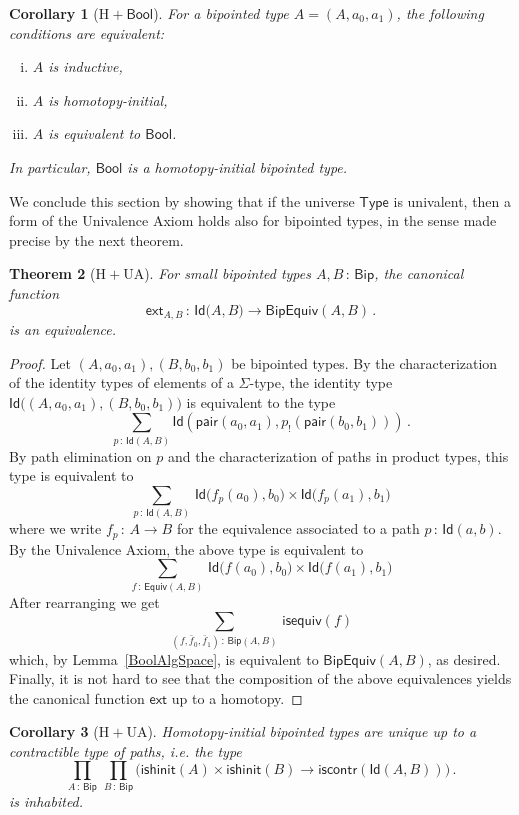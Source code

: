 \documentclass[10pt,a4paper,oneside,reqno]{amsart}
\theoremstyle{mythm}
\newtheorem{theorem}{Theorem}[section]
\newtheorem{corollary}[theorem]{Corollary}
\theoremstyle{mydef}
\theoremstyle{myrmk}
\newcommand{\co}{\,{:}\,}
\newcommand{\Hint}{\mathrm{H}}
\newcommand{\iscontr}{\mathsf{iscontr}}
\newcommand{\isequiv}{\mathsf{isequiv}}
\newcommand{\isbiphinit}{\mathsf{ishinit}}
\newcommand{\ext}{\mathsf{ext}}
\newcommand{\Bool}{\mathsf{Bool}}
\newcommand{\Id}{\mathsf{Id}}
\newcommand{\pair}{\mathsf{pair}}
\newcommand{\U}{\mathsf{Type}}
\newcommand{\Bip}{\mathsf{Bip}}
\newcommand{\BipHom}{\mathsf{Bip}}
\newcommand{\BipEquiv}{\mathsf{BipEquiv}}
\begin{document}
\begin{corollary}[$\Hint + \Bool$]  For a bipointed type $A = (A, a_0, a_1)$, the following 
conditions are equivalent:
\begin{enumerate}[(i)]
\item $A$ is inductive,
\item $A$ is homotopy-initial,
\item $A$ is equivalent to $\Bool$. 
\end{enumerate}
In particular, $\Bool$ is a homotopy-initial bipointed type.
\end{corollary}

We conclude this section by showing that if the universe $\U$ is univalent, then a form of the Univalence Axiom holds also for bipointed types, in the sense made precise by the next theorem.


\begin{theorem}[$\Hint + \mathrm{UA}$] \label{thm:bipunivalence}
For small bipointed types $A, B \co \Bip$, the canonical function
\[ 
\ext_{A,B} \co \Id \big(A,B\big) \to  \BipEquiv(A,B) \, .
\] 
is an equivalence.
\end{theorem} 

\begin{proof} 
Let $ (A,a_0,a_1), (B,b_0,b_1)$ be bipointed types. By the characterization of the identity types
of  elements of a $\Sigma$-type, the 
identity type $\Id\big( (A,a_0,a_1),  (B,b_0,b_1)\big)$ is equivalent to  the type
\[
\sum_{p \co \Id(A,B)} \Id(\pair(a_0,a_1),  p_{!}(\pair(b_0,b_1))) \, .
\]
By path elimination on $p$ and the characterization of paths in product types, this type is equivalent to
\[ 
\sum_{p \co \Id(A,B)} \, \Id \big( f_p(a_0),  b_0\big) \times \Id \big( f_p(a_1) , b_1)
 \]
where we write $f_p \co A \to B$ for the equivalence associated to a path $p \co \Id(a,b)$.  By the Univalence Axiom,
the above type is equivalent to
\[ 
\sum_{f \co \mathsf{Equiv}(A,B)} \, \Id \big( f(a_0),  b_0\big) \times \Id \big( f(a_1) , b_1\big) \]
After rearranging we get
\[
\sum_{(f, \bar{f}_0, \bar{f}_1) \co \BipHom(A,B)} \, \isequiv(f)
\]
which, by Lemma~\ref{BoolAlgSpace}, is equivalent to $\BipEquiv(A,B)$, as desired. Finally, it is not hard to see that the composition of the above equivalences yields the canonical function $\ext$ up to a homotopy.
\end{proof} 

\begin{corollary}[$\Hint + \mathrm{UA}$] \label{BoolHInitIso} 
Homotopy-initial bipointed types are unique up to a contractible type of paths, i.e. the type
\[ 
\prod_{A \co \Bip} \, \prod_{ B \co \Bip}
\big( \isbiphinit(A) \times \isbiphinit(B) \to \iscontr(\Id(A,B)) \big) \, .
\] 
is inhabited.
\end{corollary}
\end{document}
